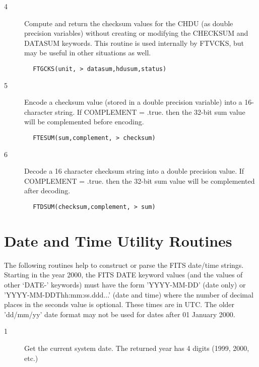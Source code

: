 \documentclass[11pt]{book}
\begin{document}
\begin{description}
\item[4 ] Compute and return the checksum values for the CHDU (as
    double precision variables) without creating or modifying the
    CHECKSUM and DATASUM keywords.  This routine is used internally by
   FTVCKS, but may be useful in other situations as well.
\end{description}

\begin{verbatim}
        FTGCKS(unit, > datasum,hdusum,status)
\end{verbatim}

\begin{description}
\item[5 ] Encode a checksum value (stored in a double precision variable)
    into a 16-character string.  If COMPLEMENT = .true. then the 32-bit
   sum value will be complemented before encoding.
\end{description}

\begin{verbatim}
        FTESUM(sum,complement, > checksum)
\end{verbatim}

\begin{description}
\item[6 ] Decode a 16 character checksum string into a double precision value.
    If COMPLEMENT = .true. then the 32-bit sum value will be complemented
   after decoding.
\end{description}

\begin{verbatim}
        FTDSUM(checksum,complement, > sum)
\end{verbatim}


\section{ Date and Time Utility Routines \label{FTGSDT}}

The following routines help to construct or parse the FITS date/time
strings.   Starting in the year 2000, the FITS DATE keyword values (and
the values of other `DATE-' keywords) must have the form 'YYYY-MM-DD'
(date only) or 'YYYY-MM-DDThh:mm:ss.ddd...' (date and time) where the
number of decimal places in the seconds value is optional.  These times
are in UTC.  The older 'dd/mm/yy' date format may not be used for dates
after 01 January 2000.


\begin{description}
\item[1 ] Get the current system date.  The returned year has 4 digits
    (1999, 2000, etc.)
\end{description}
\end{document}
